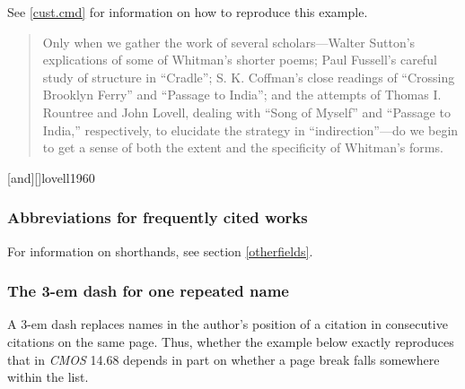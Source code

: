 \documentclass[11pt,letterpaper,oneside]{article}
\begin{document}
See \ref{cust.cmd} for information on how to reproduce this example.

\begin{quote} Only when we gather the work of several
scholars---Walter Sutton's explications of some of Whitman's shorter
poems; Paul Fussell's careful study of structure in ``Cradle''; S. K.
Coffman's close readings of ``Crossing Brooklyn Ferry'' and ``Passage
to India''; and the attempts of Thomas I. Rountree and John Lovell,
dealing with ``Song of Myself'' and ``Passage to India,''
respectively, to elucidate the strategy in ``indirection''---do we
begin to get a sense of both the extent and the specificity of
Whitman's forms.\footnotemark[1] \end{quote}

\begin{citeonly}
\item {}[and][]{lovell1960}
\end{citeonly}

\setcounter{subsubsection}{58}
\subsubsection{Abbreviations for frequently cited works}
\label{14.59}

For information on shorthands, see section \ref{otherfields}.

\begin{citebib}
\item \cite[1:126]{shurtleff1853}
\item \cite[2:330]{shurtleff1853}
\end{citebib}

\setcounter{subsubsection}{67}
\subsubsection{The 3-em dash for one repeated name}

A 3-em dash replaces names in the author's position of a citation in
consecutive citations on the same page. Thus, whether the example
below exactly reproduces that in \textit{CMOS} 14.68 depends in part
on whether a page break falls somewhere within the list.
\end{document}
